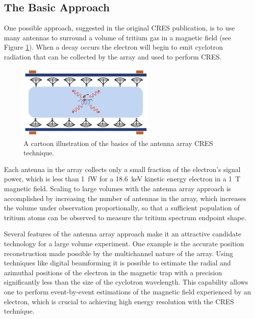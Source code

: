 \subsection{The Basic Approach}

One possible approach, suggested in the original CRES publication, is to use many antennas to surround a volume of tritium gas in a magnetic field (see Figure \ref{fig:chap3-antenna-concept-cartoon}). When a decay occurs the electron will begin to emit cyclotron radiation that can be collected by the array and used to perform CRES.
\begin{figure}[htbp]
    \centering
    \includegraphics*[width=0.6\textwidth]{figs/Chapter-3/230614_antenna_cartoon.png}
    \caption{\label{fig:chap3-antenna-concept-cartoon} A cartoon illustration of the basics of the antenna array CRES technique.}
\end{figure}
Each antenna in the array collects only a small fraction of the electron's signal power, which is less than 1~fW for a 18.6~keV kinetic energy electron in a 1~T magnetic field. Scaling to large volumes with the antenna array approach is accomplished by increasing the number of antennas in the array, which increases the volume under observation proportionally, so that a sufficient population of tritium atoms can be observed to measure the tritium spectrum endpoint shape. 

Several features of the antenna array approach make it an attractive candidate technology for a large volume experiment. One example is the accurate position reconstruction made possible by the multichannel nature of the array. Using techniques like digital beamforming it is possible to estimate the radial and azimuthal positions of the electron in the magnetic trap with a precision significantly less than the size of the cyclotron wavelength. This capability allows one to perform event-by-event estimations of the magnetic field experienced by an electron, which is crucial to achieving high energy resolution with the CRES technique.

